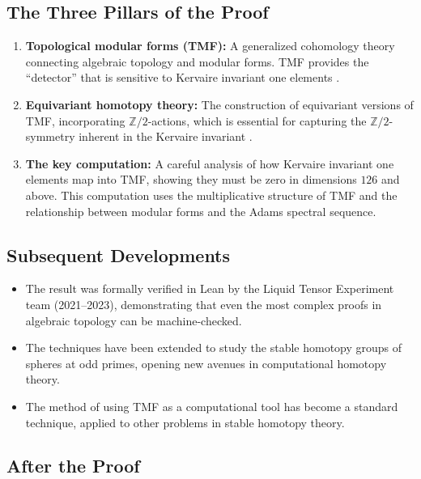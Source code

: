 \subsection{The Three Pillars of the Proof}

\begin{enumerate}
\item \textbf{Topological modular forms (TMF):} A generalized cohomology theory connecting algebraic topology and modular forms. TMF provides the ``detector'' that is sensitive to Kervaire invariant one elements \cite{hopkins2004}.

\item \textbf{Equivariant homotopy theory:} The construction of equivariant versions of TMF, incorporating $\mathbb{Z}/2$-actions, which is essential for capturing the $\mathbb{Z}/2$-symmetry inherent in the Kervaire invariant \cite{hill2010}.

\item \textbf{The key computation:} A careful analysis of how Kervaire invariant one elements map into TMF, showing they must be zero in dimensions $126$ and above. This computation uses the multiplicative structure of TMF and the relationship between modular forms and the Adams spectral sequence.
\end{enumerate}

\subsection{Subsequent Developments}

\begin{itemize}
\item The result was formally verified in Lean by the Liquid Tensor Experiment team (2021--2023), demonstrating that even the most complex proofs in algebraic topology can be machine-checked.
\item The techniques have been extended to study the stable homotopy groups of spheres at odd primes, opening new avenues in computational homotopy theory.
\item The method of using TMF as a computational tool has become a standard technique, applied to other problems in stable homotopy theory.
\end{itemize}

\subsection{After the Proof}

